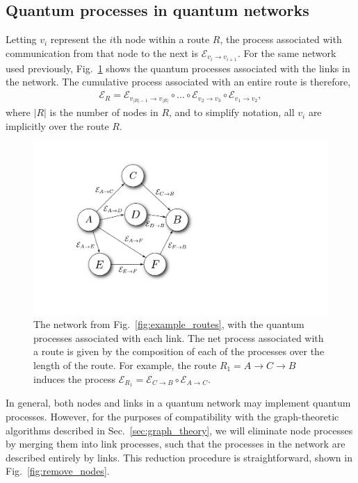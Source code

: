 \documentclass[aps, rmp, twocolumn, amsmath, amssymb, nofootinbib, superscriptaddress, longbibliography, floatfix, table-of-contents, eqsecnum]{revtex4-1}
\begin{document}
%
%

\subsection{Quantum processes in quantum networks} \label{sec:quant_proc_in} 

Letting $v_i$ represent the $i$th node within a route $R$, the process associated with communication from that node to the next is $\mathcal{E}_{v_i\to v_{i+1}}$. For the same network used previously, Fig.~\ref{fig:example_proc_graph} shows the quantum processes associated with the links in the network. The cumulative process associated with an entire route is therefore,
\begin{align}
\mathcal{E}_R = \mathcal{E}_{{v_{|R|-1}}\to v_{|R|}} \circ \dots \circ \mathcal{E}_{v_2\to v_3} \circ \mathcal{E}_{v_1\to v_2},
\end{align}
where $|R|$ is the number of nodes in $R$, and to simplify notation, all $v_i$ are implicitly over the route $R$.

\begin{figure}[!htb]
\includegraphics[width=0.6\columnwidth]{example_graph}
\caption{The network from Fig.~\ref{fig:example_routes}, with the quantum processes associated with each link. The net process associated with a route is given by the composition of each of the processes over the length of the route. For example, the route \mbox{$R_1=A\to C\to B$} induces the process \mbox{$\mathcal{E}_{R_1} = \mathcal{E}_{C\to B} \circ \mathcal{E}_{A\to C}$}.} \label{fig:example_proc_graph}
\end{figure}

In general, both nodes and links in a quantum network may implement quantum processes. However, for the purposes of compatibility with the graph-theoretic algorithms described in Sec.~\ref{sec:graph_theory}, we will eliminate node processes by merging them into link processes, such that the processes in the network are described entirely by links. This reduction procedure is straightforward, shown in Fig.~\ref{fig:remove_nodes}.
\end{document}
